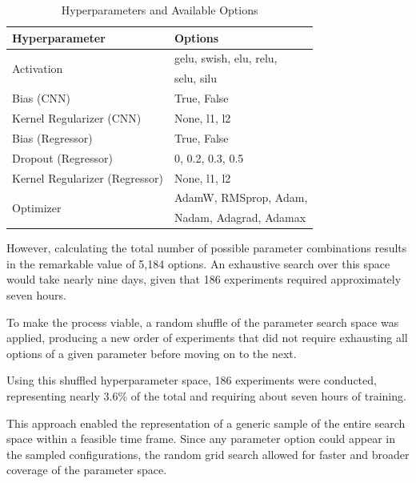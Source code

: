 \documentclass[10pt,conference]{IEEEtran}
\begin{document}

\begin{table} \small \centering
  \caption{Hyperparameters and Available Options}
  \label{tab:hyperparams_options}
\begin{tabular*}{\columnwidth}
    {@{\extracolsep{\fill}}ll}
    \toprule
    Hyperparameter & Options \\
    \midrule
    \multirow{2}{*}{Activation} & gelu, swish, elu, relu,  \\
    & selu, silu \\
    Bias (CNN) & True, False \\
    Kernel Regularizer (CNN) & None, l1, l2 \\
    Bias (Regressor) & True, False \\
    Dropout (Regressor) & 0, 0.2, 0.3, 0.5 \\
    Kernel Regularizer (Regressor) & None, l1, l2 \\
    \multirow{2}{*}{Optimizer} & AdamW, RMSprop, Adam, \\
    & Nadam, Adagrad, Adamax \\
    \bottomrule
  \end{tabular*}
\end{table}

However, calculating the total number of possible parameter combinations results in the remarkable value of 5,184 options. An exhaustive search over this space would take nearly nine days, given that 186 experiments required approximately seven hours.

To make the process viable, a random shuffle of the parameter search space was applied, producing a new order of experiments that did not require exhausting all options of a given parameter before moving on to the next.

Using this shuffled hyperparameter space, 186 experiments were conducted, representing nearly 3.6\% of the total and requiring about seven hours of training.

This approach enabled the representation of a generic sample of the entire search space within a feasible time frame. Since any parameter option could appear in the sampled configurations, the random grid search allowed for faster and broader coverage of the parameter space.
\end{document}

